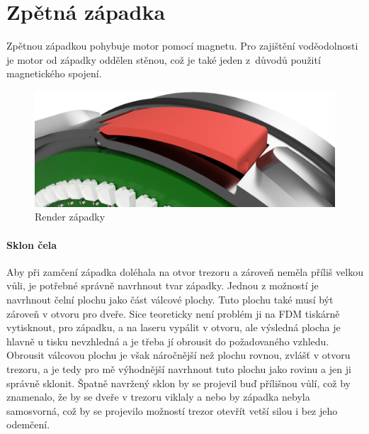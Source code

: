 \section{Zpětná západka}

    Zpětnou západkou pohybuje motor pomocí magnetu. Pro zajištění voděodolnosti je motor od západky oddělen stěnou, což je také jeden z~důvodů použití magne\-tic\-ké\-ho spojení.

\begin{figure}[h]
    \centering
    \includegraphics[width=\textwidth]{kapitoly/obrazky/E4/zapadka/render.png}
    \caption{Render západky}

    \label{fig:E4-zapadka}
\end{figure}

\clearpage
\newpage

\paragraph{Sklon čela}

Aby při zamčení západka doléhala na otvor trezoru a zároveň neměla příliš velkou vůli, je potřebné správně navrhnout tvar západky.
Jednou z možností je navrhnout čelní plochu jako část válcové plochy. Tuto plochu také musí být zároveň v otvoru pro dveře.  %
Sice teoreticky není problém ji na FDM tiskárně vytisknout, pro západku, a na laseru vypálit v otvoru, ale výsledná plocha je hlavně u tisku 
nevzhledná a je třeba jí obrousit do požadovaného vzhledu. Obrousit válcovou plochu je však náročnější než plochu rovnou, zvlášť v otvoru trezoru, 
a je tedy pro mě výhodnější navrhnout tuto plochu jako rovinu a jen ji správně sklonit. Špatně navržený sklon by se projevil buď přílišnou vůlí, 
což by znamenalo, že by se dveře v trezoru viklaly a nebo by západka nebyla samosvorná, což by se projevilo možností trezor otevřít vetší silou 
i bez jeho odemčení.

